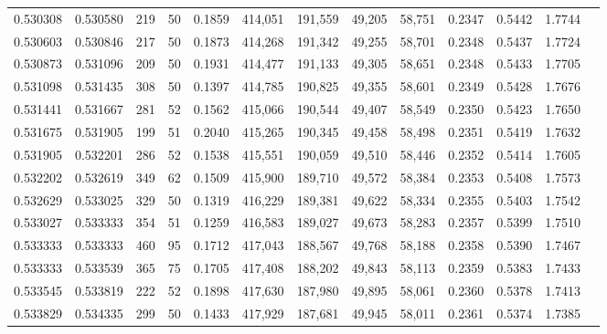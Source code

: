 \begin{tabular}{rrrrrrrrrrrrr}
0.530308 & 0.530580 &    219 &    50 &                                     0.1859 & 414,051 & 191,559 &  49,205 &  58,751 & 0.2347 & 0.5442 & 1.7744 \\
0.530603 & 0.530846 &    217 &    50 &                                     0.1873 & 414,268 & 191,342 &  49,255 &  58,701 & 0.2348 & 0.5437 & 1.7724 \\
0.530873 & 0.531096 &    209 &    50 &                                     0.1931 & 414,477 & 191,133 &  49,305 &  58,651 & 0.2348 & 0.5433 & 1.7705 \\
0.531098 & 0.531435 &    308 &    50 &                                     0.1397 & 414,785 & 190,825 &  49,355 &  58,601 & 0.2349 & 0.5428 & 1.7676 \\
0.531441 & 0.531667 &    281 &    52 &                                     0.1562 & 415,066 & 190,544 &  49,407 &  58,549 & 0.2350 & 0.5423 & 1.7650 \\
0.531675 & 0.531905 &    199 &    51 &                                     0.2040 & 415,265 & 190,345 &  49,458 &  58,498 & 0.2351 & 0.5419 & 1.7632 \\
0.531905 & 0.532201 &    286 &    52 &                                     0.1538 & 415,551 & 190,059 &  49,510 &  58,446 & 0.2352 & 0.5414 & 1.7605 \\
0.532202 & 0.532619 &    349 &    62 &                                     0.1509 & 415,900 & 189,710 &  49,572 &  58,384 & 0.2353 & 0.5408 & 1.7573 \\
0.532629 & 0.533025 &    329 &    50 &                                     0.1319 & 416,229 & 189,381 &  49,622 &  58,334 & 0.2355 & 0.5403 & 1.7542 \\
0.533027 & 0.533333 &    354 &    51 &                                     0.1259 & 416,583 & 189,027 &  49,673 &  58,283 & 0.2357 & 0.5399 & 1.7510 \\
0.533333 & 0.533333 &    460 &    95 &                                     0.1712 & 417,043 & 188,567 &  49,768 &  58,188 & 0.2358 & 0.5390 & 1.7467 \\
0.533333 & 0.533539 &    365 &    75 &                                     0.1705 & 417,408 & 188,202 &  49,843 &  58,113 & 0.2359 & 0.5383 & 1.7433 \\
0.533545 & 0.533819 &    222 &    52 &                                     0.1898 & 417,630 & 187,980 &  49,895 &  58,061 & 0.2360 & 0.5378 & 1.7413 \\
0.533829 & 0.534335 &    299 &    50 &                                     0.1433 & 417,929 & 187,681 &  49,945 &  58,011 & 0.2361 & 0.5374 & 1.7385 \\

\end{tabular}
